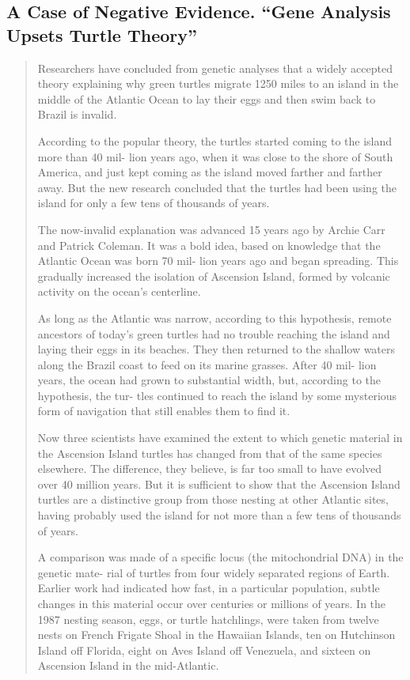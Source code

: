 \documentclass[
  12pt,
]{book}
\begin{document}
\subsection{A Case of Negative Evidence. ``Gene Analysis Upsets Turtle Theory''}\label{a-case-of-negative-evidence.-gene-analysis-upsets-turtle-theory}

\begin{quote}
Researchers have concluded from genetic analyses that a widely accepted theory explaining
why green turtles migrate 1250 miles to an island in the middle of the Atlantic Ocean to lay
their eggs and then swim back to Brazil is invalid.

According to the popular theory, the turtles started coming to the island more than 40 mil-
lion years ago, when it was close to the shore of South America, and just kept coming as the
island moved farther and farther away. But the new research concluded that the turtles had
been using the island for only a few tens of thousands of years.

The now-invalid explanation was advanced 15 years ago by Archie Carr and Patrick
Coleman. It was a bold idea, based on knowledge that the Atlantic Ocean was born 70 mil-
lion years ago and began spreading. This gradually increased the isolation of Ascension Island,
formed by volcanic activity on the ocean's centerline.

As long as the Atlantic was narrow, according to this hypothesis, remote ancestors of today's
green turtles had no trouble reaching the island and laying their eggs in its beaches. They then
returned to the shallow waters along the Brazil coast to feed on its marine grasses. After 40 mil-
lion years, the ocean had grown to substantial width, but, according to the hypothesis, the tur-
tles continued to reach the island by some mysterious form of navigation that still enables them
to find it.

Now three scientists have examined the extent to which genetic material in the Ascension
Island turtles has changed from that of the same species elsewhere. The difference, they
believe, is far too small to have evolved over 40 million years. But it is sufficient to show that
the Ascension Island turtles are a distinctive group from those nesting at other Atlantic sites,
having probably used the island for not more than a few tens of thousands of years.

A comparison was made of a specific locus (the mitochondrial DNA) in the genetic mate-
rial of turtles from four widely separated regions of Earth. Earlier work had indicated how
fast, in a particular population, subtle changes in this material occur over centuries or millions
of years. In the 1987 nesting season, eggs, or turtle hatchlings, were taken from twelve nests
on French Frigate Shoal in the Hawaiian Islands, ten on Hutchinson Island off Florida, eight
on Aves Island off Venezuela, and sixteen on Ascension Island in the mid-Atlantic.


\end{quote}
\end{document}
